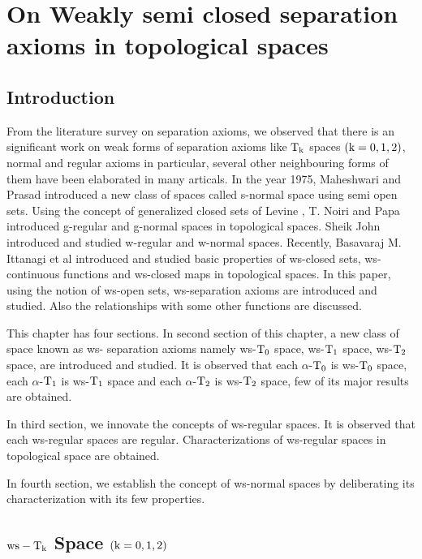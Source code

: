 \chapter{On Weakly semi closed separation axioms in topological spaces}
\graphicspath{{Chapter8/Chapter8Figs/EPS/}{Chapter8/Chapter8Figs/}}

\section{Introduction}\label{sec8.1}


From the literature survey on separation axioms, we observed that there is an significant work on weak forms of separation axioms like $\mathrm{T}_{\mathrm{k}}$ spaces $(\mathrm{k}=0, 1, 2)$, normal and regular axioms in particular, several other neighbouring forms of them have been elaborated in many articals. In the year 1975, Maheshwari and Prasad \cite{Maheshwari} introduced a new class of spaces called s-normal space using semi open sets. Using the concept of generalized closed sets of Levine \cite{Levine}, T. Noiri and Papa \cite{Popa} introduced g-regular and g-normal spaces in topological spaces. Sheik John \cite{Sheik1} introduced and studied w-regular and w-normal spaces. Recently, Basavaraj M. Ittanagi et al \cite{Basavaraj,Basavaraj1} introduced and studied basic properties of ws-closed sets, ws-continuous functions and ws-closed maps in topological spaces. In this paper, using the notion of ws-open sets, ws-separation axioms are introduced and studied. Also the relationships with some other functions are discussed.

This chapter has four sections. In second section of this chapter, a new class of space known as ws- separation axioms namely ws-$\mathrm{T}_{0}$ space, ws-$\mathrm{T}_{1}$ space, ws-$\mathrm{T}_{2}$ space, are introduced and studied. It is observed that each $\alpha$-$\mathrm{T}_{0}$ is ws-$\mathrm{T}_{0}$ space, each $\alpha$-$\mathrm{T}_{1}$ is ws-$\mathrm{T}_{1}$ space and each $\alpha$-$\mathrm{T}_{2}$ is ws-$\mathrm{T}_{2}$ space, few of its major results are obtained.

\newpage

In third section, we innovate the concepts of ws-regular spaces. It is observed that each ws-regular spaces are regular. Characterizations of ws-regular spaces in topological space are obtained.

In fourth section, we establish the concept of ws-normal spaces by deliberating its characterization with its few properties.

\section{\boldmath$\mathrm{ws}-\mathrm{T}_{\mathrm{k}}$ Space $(\mathrm{k}=0,1,2)$}\label{sec8.2}

